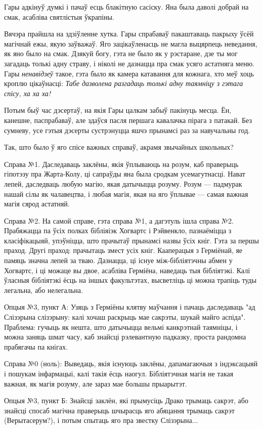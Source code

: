 Гары адкінуў думкі і пачаў есць блакітную сасіску. Яна была даволі добрай на смак,
асабліва святлістыя ўкрапіны.

Вячэра прайшла на здзіўленне хутка. Гары спрабаваў пакаштаваць пакрыху ўсёй 
магічнай ежы, якую заўважаў. Яго зацікаўленасць не магла выцярпець неведання,
як яно было на смак. Дзякуй богу, гэта не было як у рэстаране, дзе ты мог 
загадаць толькі адну страву, і ніколі не дазнацца пра смак усяго астатняга 
меню. Гары \emph{ненавідзеў} такое, гэта было як камера катавання для кожнага,
хто меў хоць кроплю цікаўнасці:  \emph{Табе дазволена разгадаць толькі
адну таямніцу з гэтага спісу, ха ха ха!}

Потым быў час дэсертаў, на якія Гары цалкам забыў пакінуць месца. Ён, канешне,
паспрабаваў, але здаўся пасля першага кавалачка пірага з патакай. Без сумневу,
усе гэтыя дэсерты сустрэнуцца яшчэ прынамсі раз за навучальны год.

Так, што было ў яго спісе важных справаў, акрамя звычайных школьных?

\begin{em}
Справа №1. Даследаваць заклёны, якія ўплываюць на розум, каб праверыць гіпотэзу 
пра Жарта-Колу, ці сапраўды яна была сродкам усемагутнасці. Нават лепей, 
даследваць любую магію, якая датычыцца розуму. Розум --- падмурак нашай
сілы як чалавецтва, і любая магія, якая на яго ўплывае --- самая важная магія сярод
астатняй. 

Справа №2. На самой справе, гэта справа №1, а дагэтуль ішла справа №2. Прабяжацца
па ўсіх полках бібліяіэк Хогвартс і Рэйвенкло, пазнаёміцца з класіфікацыяй,
упэўніцца, што прачытаў прынамсі назвы ўсіх кніг. Гэта за першы праход.
Другі праход: прачытаць змест усіх кніг. Кааперацыя з Герміёнай, яе памяць
значна лепей за тваю. Дазнацца, ці існуе між-бібліятэчны абмен у Хогвартс,
і ці можаце вы двое, асабліва Герміёна, наведаць тыя бібліятэкі. 
Калі ўласныя бібліятэкі ёсць на іншых факультэтах, высветліць ці можна 
трапіць туды легальна, або нелегальна.


Опцыя №3, пункт А: Узяць з Герміёны клятву маўчання і пачаць даследаваць 
"ад Слізэрына слізэрыну: калі хочаш раскрыць мае сакрэты, шукай майго аспіда".
Праблема: гучыць як нешта, што датычыцца вельмі канкрэтнай таямніцы, і можна 
заняць шмат часу, каб знайсці рэлевантную падказку, проста рандомна 
прабягачы па кнігах. 

Справа №0 (ноль): Выведаць, якія існуюць заклёны, дапамагаючыя з індэксацыяй і пошукам
інфармацыі, калі такія ёсць наогул. Бібліятэчная магія не такая важная, 
як магія розуму, але зараз мае большы прыарытэт.

Опцыя №3, пункт Б: Знайсці заклён, які прымусіць Драко трымаць сакрэт, або
знайсці спосаб магічна праверыць шчырасць яго абяцання трымаць сакрэт (Верытасерум?),
і потым спытаць яго пра звестку Слізэрына... 
\end{em}

